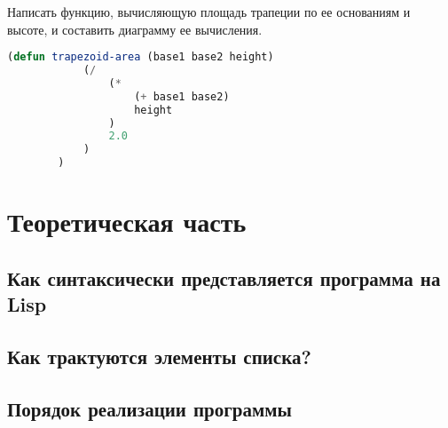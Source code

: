 \documentclass[a4paper,oneside,12pt]{extreport}
\begin{document}
\begin{task}
	Написать функцию, вычисляющую площадь трапеции по ее основаниям и высоте, и составить диаграмму ее вычисления.
	\begin{lstlisting}[language=Lisp, gobble=16]
		(defun trapezoid-area (base1 base2 height)
			(/
				(*
					(+ base1 base2)
					height
				)
				2.0
			)
		)
	\end{lstlisting}
\end{task}

\section*{Теоретическая часть}

\subsection*{Как синтаксически представляется программа на Lisp}

\subsection*{Как трактуются элементы списка?}

\subsection*{Порядок реализации программы}
\end{document}
